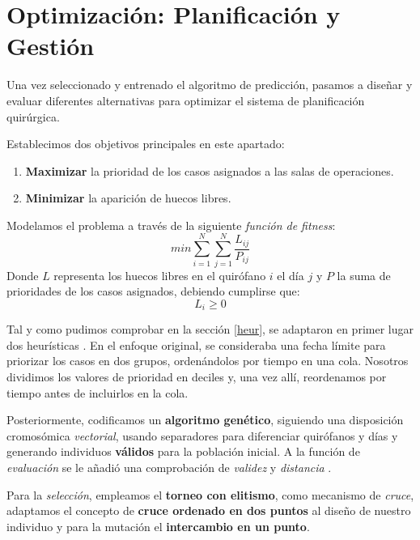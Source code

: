 
\newpage

\section{Optimización: Planificación y Gestión}


Una vez seleccionado y entrenado el algoritmo de predicción, pasamos a diseñar y evaluar diferentes alternativas para optimizar el sistema de planificación quirúrgica.

Establecimos dos objetivos principales en este apartado:
\begin{enumerate}
    \item \textbf{Maximizar} la prioridad de los casos asignados a las salas de operaciones.
    \item \textbf{Minimizar} la aparición de huecos libres.
\end{enumerate}

Modelamos el problema a través de la siguiente \textit{función de fitness}:
\begin{equation}
    min \sum_{i=1}^{N} \sum_{j=1}^{N}\frac{L_{ij}}{P_{ij}}
\end{equation}
Donde $L$ representa los huecos libres en el quirófano $i$ el día $j$ y $P$ la suma de prioridades de los casos asignados, debiendo cumplirse que:
\begin{equation}
    L_{i}\geq 0
\end{equation}

Tal y como pudimos comprobar en la sección \ref{heur}, se adaptaron en primer lugar dos heurísticas \cite{Lin2020AScheduling}. 
En el enfoque original, se consideraba una fecha límite para priorizar los casos en dos grupos, ordenándolos por tiempo en una cola. Nosotros dividimos los valores de prioridad en deciles y, una vez allí, reordenamos por tiempo antes de incluirlos en la cola.

Posteriormente, codificamos un \textbf{algoritmo genético}, siguiendo una disposición cromosómica \textit{vectorial}, usando separadores para diferenciar quirófanos y días y generando individuos \textbf{válidos} para la población inicial.
A la función de \textit{evaluación} se le añadió una comprobación de \textit{validez} y \textit{distancia} \cite{CoelloCoello2002TheoreticalArt}.

Para la \textit{selección}, empleamos el \textbf{torneo con elitismo}, como mecanismo de \textit{cruce}, adaptamos el concepto de \textbf{cruce ordenado en dos puntos} al diseño de nuestro individuo \cite{Lin2020AScheduling} y para la mutación el \textbf{intercambio en un punto}.

